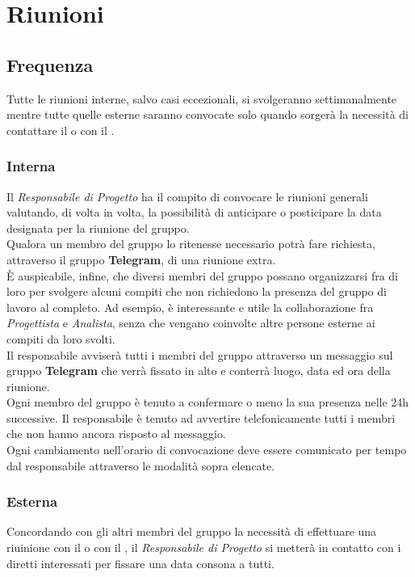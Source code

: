 \section{Riunioni}
  \subsection{Frequenza}
    Tutte le riunioni interne, salvo casi eccezionali, si svolgeranno settimanalmente mentre tutte quelle esterne saranno convocate solo quando sorgerà la necessità di contattare il  o con il .

    \subsubsection{Interna}
      Il \emph{Responsabile di Progetto} ha il compito di convocare le riunioni generali valutando, di volta in volta, la possibilità di anticipare o posticipare la data
      designata per la riunione del gruppo.\\
      Qualora un membro del gruppo lo ritenesse necessario potrà fare richiesta, attraverso il gruppo \textbf{Telegram}, di una riunione extra.\\
      È auspicabile, infine, che diversi membri del gruppo possano organizzarsi fra di loro per svolgere alcuni compiti che non richiedono la presenza  del gruppo di lavoro
      al completo. Ad esempio, è interessante e utile la collaborazione fra \emph{Progettista} e \emph{Analista}, senza che vengano coinvolte altre persone esterne ai compiti
      da loro svolti.\\
      Il responsabile avviserà tutti i membri del gruppo attraverso un messaggio sul gruppo \textbf{Telegram} che verrà fissato in alto e conterrà luogo, data ed ora della riunione.\\
      Ogni membro del gruppo è tenuto a confermare o meno la sua presenza nelle 24h successive. Il responsabile è tenuto ad avvertire telefonicamente tutti i membri che
      non hanno ancora risposto al messaggio.\\
      Ogni cambiamento nell'orario di convocazione deve essere comunicato per tempo dal responsabile attraverso le modalità sopra elencate.
    \subsubsection{Esterna}
      Concordando con gli altri membri del gruppo la necessità di effettuare una riuinione con il  o con il , il \emph{Responsabile di Progetto}
      si metterà in contatto con i diretti interessati per fissare una data consona a tutti.
